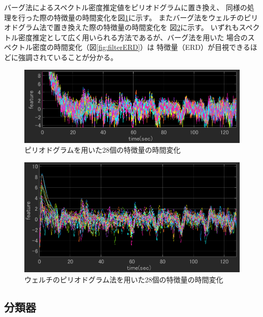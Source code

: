 バーグ法によるスペクトル密度推定値をピリオドグラムに置き換え、
同様の処理を行った際の特徴量の時間変化を図\ref{fig:fftERD}に示す。
またバーグ法をウェルチのピリオドグラム法で置き換えた際の特徴量の時間変化を
図\ref{fig:welchERD}に示す。
いずれもスペクトル密度推定として広く用いられる方法であるが、バーグ法を用いた
場合のスペクトル密度の時間変化（図\ref{fig:filterERD}）は
特徴量（ERD）が目視できるほどに強調されていることが分かる。

\begin{figure}[tp]
    \centering
    \includegraphics[width=13cm]{images/feature_sub1_fft.png}
    \caption{ピリオドグラムを用いた28個の特徴量の時間変化}
    \label{fig:fftERD}
\end{figure}
\begin{figure}[tp]
    \centering
    \includegraphics[width=13cm]{images/feature_sub1_welch.png}
    \caption{ウェルチのピリオドグラム法を用いた28個の特徴量の時間変化}
    \label{fig:welchERD}
\end{figure}

\subsection{分類器}